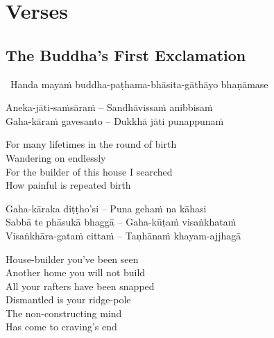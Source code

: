 
\chapter{Verses}

\section{The Buddha's First Exclamation}
\label{buddhas-first-exclamation}

\begin{leader}
  \anglebracketleft\ \hspace{-0.5mm}Handa mayaṁ buddha-paṭhama-bhāsita-gāthāyo bhaṇāmase \hspace{-0.5mm}\anglebracketright\
\end{leader}

\begin{verses}
  Aneka-jāti-saṁsāraṁ – Sandhāvissaṁ anibbisaṁ\\
  Gaha-kāraṁ gavesanto – Dukkhā jāti punappunaṁ
\end{verses}

\begin{english-verses}
  For many lifetimes in the round of birth\\
  Wandering on endlessly\\
  For the builder of this house I searched\\
  How painful is repeated birth
\end{english-verses}

\begin{verses}
  Gaha-kāraka diṭṭho'si – Puna gehaṁ na kāhasi\\
  Sabbā te phāsukā bhaggā – Gaha-kūṭaṁ visaṅkhataṁ\\
  Visaṅkhāra-gataṁ cittaṁ – Taṇhānaṁ khayam-ajjhagā
\end{verses}

\begin{english-verses}
  House-builder you've been seen\\
  Another home you will not build\\
  All your rafters have been snapped\\
  Dismantled is your ridge-pole\\
  The non-constructing mind\\
  Has come to craving's end
\end{english-verses}

